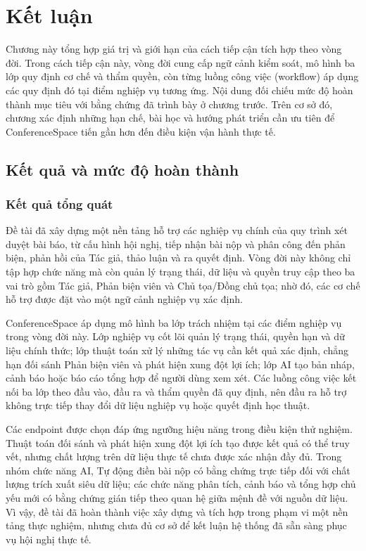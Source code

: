 \chapter{Kết luận}
\label{Chapter5}

Chương này tổng hợp giá trị và giới hạn của cách tiếp cận tích hợp theo vòng đời. Trong cách tiếp cận này, vòng đời cung cấp ngữ cảnh kiểm soát, mô hình ba lớp quy định cơ chế và thẩm quyền, còn từng luồng công việc (workflow) áp dụng các quy định đó tại điểm nghiệp vụ tương ứng. Nội dung đối chiếu mức độ hoàn thành mục tiêu với bằng chứng đã trình bày ở chương trước. Trên cơ sở đó, chương xác định những hạn chế, bài học và hướng phát triển cần ưu tiên để ConferenceSpace tiến gần hơn đến điều kiện vận hành thực tế.

\section{Kết quả và mức độ hoàn thành}

\subsection{Kết quả tổng quát}

Đề tài đã xây dựng một nền tảng hỗ trợ các nghiệp vụ chính của quy trình xét duyệt bài báo, từ cấu hình hội nghị, tiếp nhận bài nộp và phân công đến phản biện, phản hồi của Tác giả, thảo luận và ra quyết định. Vòng đời này không chỉ tập hợp chức năng mà còn quản lý trạng thái, dữ liệu và quyền truy cập theo ba vai trò gồm Tác giả, Phản biện viên và Chủ tọa/Đồng chủ tọa; nhờ đó, các cơ chế hỗ trợ được đặt vào một ngữ cảnh nghiệp vụ xác định.

ConferenceSpace áp dụng mô hình ba lớp trách nhiệm tại các điểm nghiệp vụ trong vòng đời này. Lớp nghiệp vụ cốt lõi quản lý trạng thái, quyền hạn và dữ liệu chính thức; lớp thuật toán xử lý những tác vụ cần kết quả xác định, chẳng hạn đối sánh Phản biện viên và phát hiện xung đột lợi ích; lớp AI tạo bản nháp, cảnh báo hoặc báo cáo tổng hợp để người dùng xem xét. Các luồng công việc kết nối ba lớp theo đầu vào, đầu ra và thẩm quyền đã quy định, nên đầu ra hỗ trợ không trực tiếp thay đổi dữ liệu nghiệp vụ hoặc quyết định học thuật.

Các endpoint được chọn đáp ứng ngưỡng hiệu năng trong điều kiện thử nghiệm. Thuật toán đối sánh và phát hiện xung đột lợi ích tạo được kết quả có thể truy vết, nhưng chất lượng trên dữ liệu thực tế chưa được xác nhận đầy đủ. Trong nhóm chức năng AI, Tự động điền bài nộp có bằng chứng trực tiếp đối với chất lượng trích xuất siêu dữ liệu; các chức năng phân tích, cảnh báo và tổng hợp chủ yếu mới có bằng chứng gián tiếp theo quan hệ giữa mệnh đề với nguồn dữ liệu. Vì vậy, đề tài đã hoàn thành việc xây dựng và tích hợp trong phạm vi một nền tảng thực nghiệm, nhưng chưa đủ cơ sở để kết luận hệ thống đã sẵn sàng phục vụ hội nghị thực tế.

